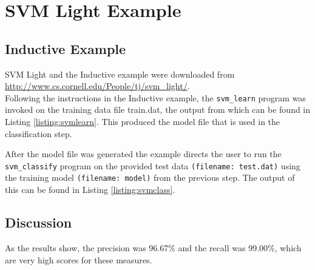 \section{SVM Light Example}

\subsection{Inductive Example}
SVM Light \cite{svmlight} and the Inductive example were downloaded from \url{http://www.cs.cornell.edu/People/tj/svm_light/}.\\

Following the instructions in the Inductive example, the \texttt{svm\_learn} program was invoked on the training data file train.dat, the output from which can be found in Listing \ref{listing:svmlearn}.  This produced the model file that is used in the classification step.



After the model file was generated the example directs the user to run the \texttt{svm\_classify} program on the provided test data \texttt{(filename: test.dat)} using the training model \texttt{(filename: model)} from the previous step.  The output of this can be found in Listing \ref{listing:svmclass}.



\subsection{Discussion}
As the results show, the precision was 96.67\% and the recall was 99.00\%, which are very high scores for these measures.  

